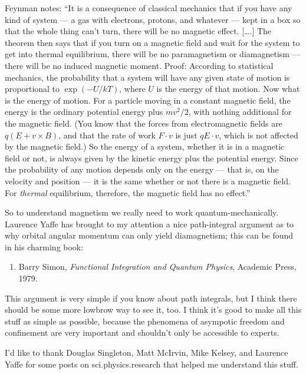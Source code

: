 \documentclass{article}
\def\tightlist{}
\begin{document}
Feynman notes: ``It is a consequence of classical mechanics that if you
have any kind of system --- a gas with electrons, protons, and whatever
--- kept in a box so that the whole thing can't turn, there will be no
magnetic effect. {[}\ldots.{]} The theorem then says that if you turn on
a magnetic field and wait for the system to get into thermal
equilibrium, there will be no paramagnetism or diamagnetism --- there
will be no induced magnetic moment. Proof: According to statistical
mechanics, the probability that a system will have any given state of
motion is proportional to \(\exp(-U/kT)\), where \(U\) is the energy of
that motion. Now what is the energy of motion. For a particle moving in
a constant magnetic field, the energy is the ordinary potential energy
plus \(mv^2/2\), with nothing additional for the magnetic field. (You
know that the forces from electromagnetic fields are
\(q(E + v \times B)\), and that the rate of work \(F\cdot v\) is just
\(qE\cdot v\), which is not affected by the magnetic field.) So the
energy of a system, whether it is in a magnetic field or not, is always
given by the kinetic energy plus the potential energy. Since the
probability of any motion depends only on the energy --- that is, on the
velocity and position --- it is the same whether or not there is a
magnetic field. For \emph{thermal} equilibrium, therefore, the magnetic
field has no effect.''

So to understand magnetism we really need to work quantum-mechanically.
Laurence Yaffe has brought to my attention a nice path-integral argument
as to why orbital angular momentum can only yield diamagnetism; this can
be found in his charming book:

\begin{enumerate}
\def\labelenumi{\arabic{enumi})}
\setcounter{enumi}{4}
\tightlist
\item
  Barry Simon, \emph{Functional Integration and Quantum Physics},
  Academic Press, 1979.
\end{enumerate}

This argument is very simple if you know about path integrals, but I
think there should be some more lowbrow way to see it, too. I think it's
good to make all this stuff as simple as possible, because the phenomena
of asympotic freedom and confinement are very important and shouldn't
only be accessible to experts.

I'd like to thank Douglas Singleton, Matt McIrvin, Mike Kelsey, and
Laurence Yaffe for some posts on sci.physics.research that helped me
understand this stuff.
\end{document}
